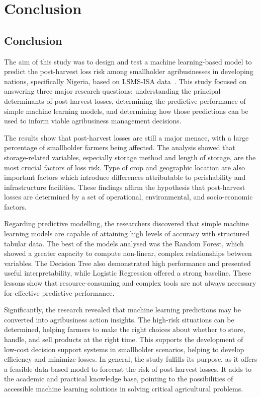 \chapter{Conclusion}
\label{chap:concl}

\section{Conclusion}

The aim of this study was to design and test a machine learning-based model to predict the
post-harvest loss risk among smallholder agribusinesses in developing nations, specifically Nigeria,
based on LSMS-ISA data~\cite{ghspanel2024nigeria}. This study focused on answering three major
research questions: understanding the principal determinants of post-harvest losses, determining the
predictive performance of simple machine learning models, and determining how those predictions can
be used to inform viable agribusiness management decisions.

The results show that post-harvest losses are still a major menace, with a large percentage of
smallholder farmers being affected. The analysis showed that storage-related variables, especially
storage method and length of storage, are the most crucial factors of loss risk. Type of crop and
geographic location are also important factors which introduce differences attributable to
perishability and infrastructure facilities. These findings affirm the hypothesis that post-harvest
losses are determined by a set of operational, environmental, and socio-economic factors.

Regarding predictive modelling, the researchers discovered that simple machine learning models are
capable of attaining high levels of accuracy with structured tabular data. The best of the models
analysed was the Random Forest, which showed a greater capacity to compute non-linear, complex
relationships between variables. The Decision Tree also demonstrated high performance and presented
useful interpretability, while Logistic Regression offered a strong baseline. These lessons show
that resource-consuming and complex tools are not always necessary for effective predictive
performance.

Significantly, the research revealed that machine learning predictions may be converted into
agribusiness action insights. The high-risk situations can be determined, helping farmers to make
the right choices about whether to store, handle, and sell products at the right time. This
supports the development of low-cost decision support systems in smallholder scenarios, helping to
develop efficiency and minimize losses. In general, the study fulfills its purpose, as it offers a
feasible data-based model to forecast the risk of post-harvest losses. It adds to the academic and
practical knowledge base, pointing to the possibilities of accessible machine learning solutions
in solving critical agricultural problems.


